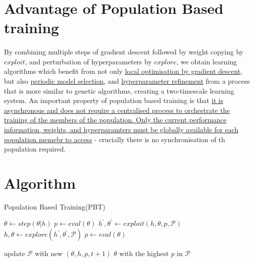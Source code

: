\documentclass[12pt,a4paper]{article}
\begin{document}
\section{Advantage of Population Based training}
\paragraph{}By combining multiple steps of gradient descent followed by weight copying by $\mathit{exploit}$, and perturbation of hyperparameters by $\mathit{explore}$, we obtain learning algorithms which benefit from not only \uline{local optimisation by gradient descent}, but also \uline{periodic model selection}, and \uline{hyperparameter refinement} from a process that is more similar to genetic algorithms, creating a two-timescale learning system. An important property of population based training is that \uline{it is asynchronous and does not require a centralised process to orchestrate the training of the members of the population. Only the current performance information, weights, and hyperparamters must be globally available for each population memebr to access} - crucially there is no synchronisation of th population required.
\section{Algorithm}
\begin{algorithm}
	\caption{Population Based Training(PBT)}
	\begin{algorithmic}[1]
				\State $\theta \leftarrow \mathit{step}(\theta|h)$
				\State $p \leftarrow \mathit{eval}(\theta)$ 
					\State $h^{'}, \theta^{'} \leftarrow \mathit{exploit}(h, \theta, p, \mathcal{P})$
						\State $h, \theta \leftarrow \mathit{explore}(h^{'}, \theta^{'}, \mathcal{P})$
						\State $p \leftarrow \mathit{eval}(\theta)$
					\EndIf
				
				\EndIf
				\State update $\mathcal{P}$ with new $(\theta, h, p, t + 1)$
			\EndWhile
		\EndFor
		\State \Return $\theta$ with the highest $p$ in $\mathcal{P}$
	\EndFunction
	\end{algorithmic}
\end{algorithm}



\end{document}

